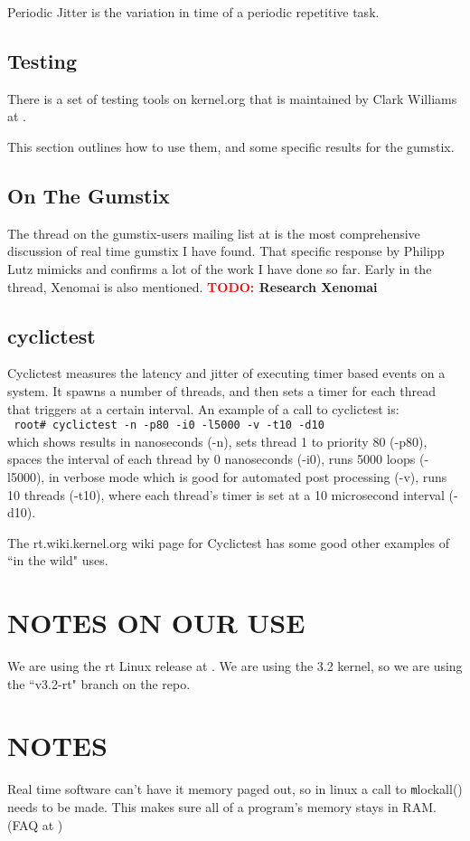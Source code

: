 \documentclass{article}
\newcommand{\TODO}[1]{ {\bf \textcolor{red}{TODO:} #1 }}
\newcommand{\rootCom}[1]{\\\indent\indent\texttt{ \small root\# #1}\\}
\begin{document}
Periodic Jitter is the variation in time of a periodic repetitive task.  

\subsection{Testing}
There is a set of testing tools on kernel.org that is maintained by Clark Williams at \cite{RTTest}.

This section outlines how to use them, and some specific results for the gumstix.

\subsection{On The Gumstix}
The thread on the gumstix-users mailing list at \cite{gumstixRtThread} is the most comprehensive discussion of real time gumstix I have found.  That specific response by Philipp Lutz mimicks and confirms a lot of the work I have done so far. Early in the thread, Xenomai \cite{xenomai} is also mentioned.  \TODO{Research Xenomai}

\subsection{cyclictest}
Cyclictest measures the latency and jitter of executing timer based events on a system.  It spawns a number of threads, and then sets a timer for each thread that triggers at a certain interval.  An example of a call to cyclictest is: \rootCom{cyclictest -n -p80 -i0 -l5000 -v -t10 -d10}which shows results in nanoseconds (-n), sets thread 1 to priority 80 (-p80), spaces the interval of each thread by 0 nanoseconds (-i0), runs 5000 loops (-l5000), in verbose mode which is good for automated post processing (-v), runs 10 threads (-t10), where each thread's timer is set at a 10 microsecond interval (-d10).

The rt.wiki.kernel.org wiki page for Cyclictest has some good other examples of ``in the wild" uses. \cite{rtWikiCyclicTest}


\section{NOTES ON OUR USE}
We are using the rt Linux release at \cite{RealTimeLinuxPatch}.  We are using the 3.2 kernel, so we are using the ``v3.2-rt" branch on the repo.

\section{NOTES}
Real time software can't have it memory paged out, so in linux a call to {\texttt mlockall()} needs to be made.  This makes sure all of a program's memory stays in RAM. (FAQ at \cite{RealTimeLinux})


\end{document}
